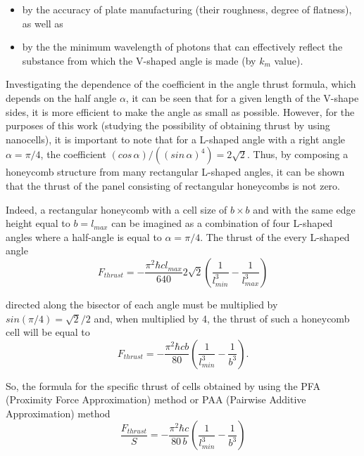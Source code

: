 \documentclass[twoside, 10pt, ptm]{article}
\begin{document}
\begin{multicols}{2}
\begin{itemize}
\item
  by the accuracy of plate manufacturing (their roughness,
  degree of flatness), as well as
\item
  by the the minimum wavelength of photons that can effectively reflect
  the substance from which the \mbox{V-shaped} angle is made (by \(k_m\) value).
\end{itemize}

    Investigating the dependence of the coefficient in the angle thrust
formula, which depends on the half angle \(\alpha\), it can be
seen that for a given length of the  \mbox{V-shape} sides, it is more efficient
to make the angle as small as possible. However, for the purposes of
this work (studying the possibility of obtaining thrust by using
nanocells), it is important to note that for a \mbox{L-shaped} angle with a right angle
\(\alpha = {\pi}/{4}\), the coefficient
\(\left({cos\, \alpha}\right)\big/\left({\left(sin\, \alpha\right)^4}\right) = 2\sqrt{2}\).
Thus, by composing a honeycomb structure from many
rectangular \mbox{L-shaped} angles, it can be shown that the thrust of the panel consisting
of rectangular honeycombs is not zero.

Indeed, a rectangular honeycomb with a cell size of \(b \times b\) and
with the same edge height equal to \(b = l_{max}\) can be imagined as a
combination of four \mbox{L-shaped} angles where a half-angle is equal to
\(\alpha = {\pi}/{4}\). The thrust of the every \mbox{L-shaped} angle
\noindent
\begin{equation}F_{thrust} = - \frac{\pi^2\hbar c l_{max}}{640} 2\sqrt{2} \left(\frac{1}{l_{min}^3} - \frac{1}{l_{max}^3}\right)\end{equation}

directed along the bisector of each angle must be multiplied by
\(sin\left({\pi}/{4}\right)={\sqrt{2}}\big/{2}\) and, when multiplied by
4, the thrust of such a honeycomb cell will be equal to
\noindent
\begin{equation}F_{thrust} = - \frac{\pi^2\hbar c b}{80} \left(\frac{1}{l_{min}^3} - \frac{1}{b^3}\right).\end{equation}

So, the formula for the specific thrust of cells obtained by using the PFA
(Proximity Force Approximation) method or PAA (Pairwise Additive
Approximation) method
\noindent
\begin{equation}\frac{F_{thrust}}{S} = - \frac{\pi^2\hbar c}{80\, b} \left(\frac{1}{l_{min}^3} - \frac{1}{b^3}\right)\end{equation}


\end{multicols}
\end{document}
